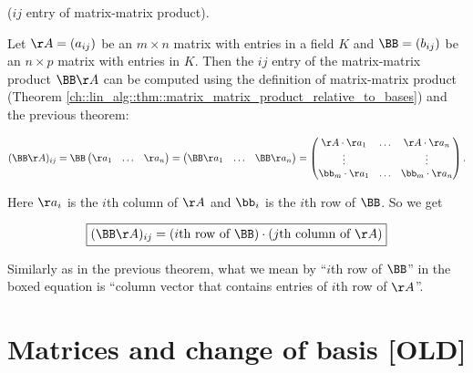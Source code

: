 \begin{theorem}
\label{ch::lin_alg::thm::coordinates_of_matrix_matrix_product}

    ($ij$ entry of matrix-matrix product). 
    
    Let $\AA = (a_{ij})$ be an $m \times n$ matrix with entries in a field $K$ and $\BB = (b_{ij})$ be an $n \times p$ matrix with entries in $K$. Then the $ij$ entry of the matrix-matrix product $\BB \AA$ can be computed using the definition of matrix-matrix product (Theorem \ref{ch::lin_alg::thm::matrix_matrix_product_relative_to_bases}) and the previous theorem:
    
    \begin{align*}
        (\BB \AA)_{ij}
        = 
        \BB
        \begin{pmatrix}
            \aa_1 & \hdots & \aa_n
        \end{pmatrix}
        =
        \begin{pmatrix}
            \BB \aa_1 & \hdots & \BB \aa_n
        \end{pmatrix}
        =
        \begin{pmatrix}
            \AA \cdot \aa_1 & \hdots & \AA \cdot \aa_n \\
            \vdots & & \vdots \\
            \bb_m \cdot \aa_1 & \hdots & \bb_m \cdot \aa_n
        \end{pmatrix}.
    \end{align*}
    
    Here $\aa_i$ is the $i$th column of $\AA$ and $\bb_i$ is the $i$th row of $\BB$. So we get
    
    \begin{align*}
        \boxed
        {
            (\BB \AA)_{ij} = (\text{$i$th row of $\BB$}) \cdot (\text{$j$th column of $\AA$})
        }
    \end{align*}
    
    Similarly as in the previous theorem, what we mean by ``$i$th row of $\BB$'' in the boxed equation is ``column vector that contains entries of $i$th row of $\AA$''.
\end{theorem}

\section*{Matrices and change of basis [OLD]}

